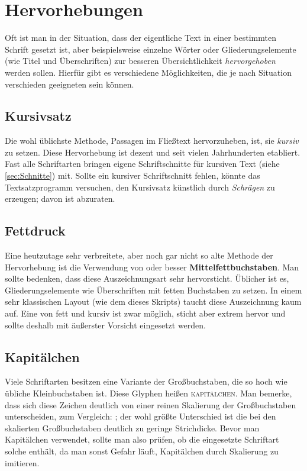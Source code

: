 \chapter{Hervorhebungen}

Oft ist man in der Situation, dass der eigentliche Text in einer bestimmten
Schrift gesetzt ist, aber beispielsweise einzelne Wörter oder
Gliederungselemente (wie Titel und Überschriften) zur besseren Übersichtlichkeit
\emph{hervorgehoben} werden sollen. Hierfür gibt es verschiedene Möglichkeiten, die
je nach Situation verschieden geeigneten sein können.

\section{Kursivsatz}

Die wohl üblichste Methode, Passagen
im Fließtext hervorzuheben, ist, sie \emph{kursiv} zu setzen. Diese Hervorhebung
ist dezent und seit vielen Jahrhunderten etabliert. Fast alle Schriftarten
bringen eigene Schriftschnitte für kursiven Text (siehe \cref{sec:Schnitte})
mit. Sollte ein kursiver Schriftschnitt fehlen, könnte das Textsatzprogramm
versuchen, den Kursivsatz künstlich durch \textsl{Schrägen} zu erzeugen; davon
ist abzuraten.

\section{Fettdruck}

Eine heutzutage sehr verbreitete, aber noch gar nicht so alte Methode der
Hervorhebung ist die Verwendung von {\selectfont {Fett-}} oder
besser \textbf{Mittelfettbuchstaben}. Man sollte bedenken, dass diese
Auszeichnungsart sehr hervorsticht. Üblicher ist es, Gliederungselemente wie
Überschriften mit fetten Buchstaben zu setzen. In einem sehr klassischen Layout
(wie dem dieses Skripts) taucht diese Auszeichnung kaum auf. Eine
\emph{{\selectfont{Kombination}}} von fett und kursiv ist zwar
möglich, sticht aber extrem hervor und sollte deshalb mit äußerster Vorsicht
eingesetzt werden.

\section{Kapitälchen}

Viele Schriftarten besitzen eine
Variante der Großbuchstaben, die so hoch wie übliche Kleinbuchstaben ist. Diese
Glyphen heißen \textsc{kapitälchen}. Man bemerke, dass sich diese Zeichen
deutlich von einer reinen Skalierung der Großbuchstaben unterscheiden, zum
Vergleich: ; der wohl größte Unterschied ist die bei
den skalierten Großbuchstaben deutlich zu geringe Strichdicke. Bevor man
Kapitälchen verwendet, sollte man also prüfen, ob die eingesetzte Schriftart
solche enthält, da man sonst Gefahr läuft, Kapitälchen durch Skalierung zu
imitieren.

